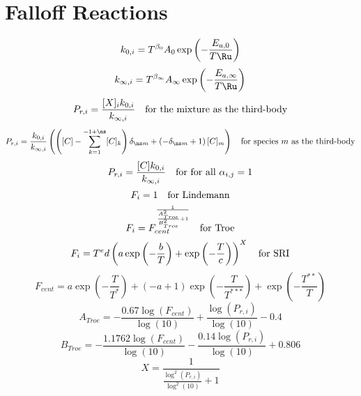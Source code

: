 \documentclass[a4paper,10pt]{article}
\begin{document}
\section{Falloff Reactions}
\begin{dmath} k_{0, i} = T^{\beta_0} A_{0} \operatorname{exp}\left({- \frac{E_{a, 0}}{T \Ru}}\right)\end{dmath} 
\begin{dmath} k_{\infty, i} = T^{\beta_{\infty}} A_{\infty} \operatorname{exp}\left({- \frac{E_{a, \infty}}{T \Ru}}\right)\end{dmath} 
\begin{dmath} P_{r, i}=\frac{[X]_{i} k_{0, i}}{k_{\infty, i}}\text{\quad for the mixture as the third-body}\end{dmath} 
\begin{dmath} P_{r, i}=\frac{k_{0, i}}{k_{\infty, i}} \left(\left([C] - \sum_{k=1}^{-1 + \ns} [C]_{k}\right) \delta_{\ns m} + \left(- \delta_{\ns m} + 1\right) [C]_{m}\right)\text{\quad for species $m$ as the third-body}\end{dmath} 
\begin{dmath} P_{r, i}=\frac{[C] k_{0, i}}{k_{\infty, i}}\text{\quad for for all $\alpha_{i, j} = 1$}\end{dmath} 
\begin{dmath} F_{i}=1\text{\quad for Lindemann}\end{dmath} 
\begin{dmath} F_{i}=F_{cent}^{\frac{1}{\frac{A_{Troe}^{2}}{B_{Troe}^{2}} + 1}}\text{\quad for Troe}\end{dmath} 
\begin{dmath} F_{i}=T^{e} d \left(a \operatorname{exp}\left({- \frac{b}{T}}\right) + \operatorname{exp}\left({- \frac{T}{c}}\right)\right)^{X}\text{\quad for SRI}\end{dmath} 
\begin{dmath} F_{cent} = a \operatorname{exp}\left({- \frac{T}{T^{*}}}\right) + \left(- a + 1\right) \operatorname{exp}\left({- \frac{T}{T^{***}}}\right) + \operatorname{exp}\left({- \frac{T^{**}}{T}}\right)\end{dmath} 
\begin{dmath} A_{Troe} = - \frac{0.67 \log{\left (F_{cent} \right )}}{\log{\left (10 \right )}} + \frac{\log{\left (P_{r, i} \right )}}{\log{\left (10 \right )}} - 0.4\end{dmath} 
\begin{dmath} B_{Troe} = - \frac{1.1762 \log{\left (F_{cent} \right )}}{\log{\left (10 \right )}} - \frac{0.14 \log{\left (P_{r, i} \right )}}{\log{\left (10 \right )}} + 0.806\end{dmath} 
\begin{dmath} X = \frac{1}{\frac{\log^{2}{\left (P_{r, i} \right )}}{\log^{2}{\left (10 \right )}} + 1}\end{dmath} 
\end{document}
